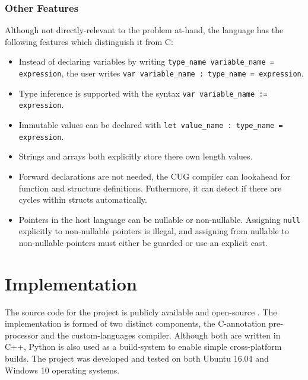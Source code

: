 \documentclass[a4paper,12pt,twoside,openright]{report}
\begin{document}

\subsection{Other Features}

Although not directly-relevant to the problem at-hand, the language has the
following features which distinguish it from C:

\begin{itemize}

    \item Instead of declaring variables by writing \texttt{type\_name
    variable\_name = expression}, the user writes \texttt{var variable\_name :
    type\_name = expression}.

    \item Type inference is supported with the syntax \texttt{var variable\_name
    := expression}.

    \item Immutable values can be declared with \texttt{let value\_name :
    type\_name = expression}.

    \item Strings and arrays both explicitly store there own length values.

    \item Forward declarations are not needed, the CUG compiler can lookahead for
    function and structure definitions. Futhermore, it can detect if there are
    cycles within structs automatically.

    \item Pointers in the host language can be nullable or non-nullable.
    Assigning \texttt{null} explicitly to non-nullable pointers is illegal, and
    assigning from nullable to non-nullable pointers must either be guarded or
    use an explicit cast.

\end{itemize}

\chapter{Implementation}


The source code for the project is publicly available and open-source
\cite{ProjectSource}. The implementation is formed of two distinct components,
the C-annotation pre-processor and the custom-languages compiler. Although both
are written in C++, Python is also used as a build-system to enable simple
cross-platform builds. The project was developed and tested on both Ubuntu
16.04 and Windows 10 operating systems.
\end{document}
